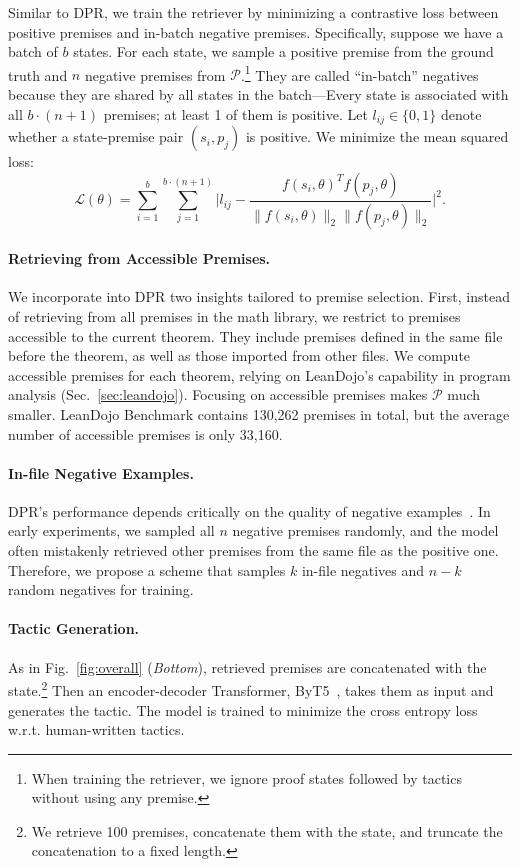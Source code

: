 \documentclass{article}
\newcommand{\smallsec}[1]{\vspace{-1mm} \paragraph{#1.}}
\newcommand\numpremises{130,262}
\newcommand\numaccessiblepremises{33,160}
\begin{document}
Similar to DPR, we train the retriever by minimizing a contrastive loss between positive premises and in-batch negative premises. Specifically, suppose we have a batch of $b$ states. For each state, we sample a positive premise from the ground truth and $n$ negative premises from $\mathcal{P}$.\footnote{When training the retriever, we ignore proof states followed by tactics without using any premise.} They are called ``in-batch'' negatives because they are shared by all states in the batch---Every state is associated with all $b \cdot (n+1)$ premises; at least 1 of them is positive.
Let $l_{ij} \in \{0, 1\}$ denote whether a state-premise pair $(s_i, p_j)$ is positive. We minimize the mean squared loss: 
\begin{equation}
\mathcal{L(\theta)} = \sum_{i=1}^{b} \sum_{j=1}^{b \cdot (n + 1)} \Big\lvert l_{ij} - \frac{f(s_i, \theta)^T f(p_j, \theta)}{\lVert f(s_i, \theta) \rVert_2 \lVert f(p_j, \theta) \rVert_2} \Big\rvert^{2}.
\end{equation}


\smallsec{Retrieving from Accessible Premises} We incorporate into DPR two insights tailored to premise selection.
First, instead of retrieving from all premises in the math library, we restrict to premises accessible to the current theorem. They include premises defined in the same file before the theorem, as well as those imported from other files. We compute accessible premises for each theorem, relying on LeanDojo's capability in program analysis (Sec.~\ref{sec:leandojo}). Focusing on accessible premises makes $\mathcal{P}$ much smaller. LeanDojo Benchmark contains {\numpremises} premises in total, but the average number of accessible premises is only {\numaccessiblepremises}.

\smallsec{In-file Negative Examples}
DPR's performance depends critically on the quality of negative examples~\cite{zhan2021optimizing,lu2021multi}. In early experiments, we sampled all $n$ negative premises randomly, and the model often mistakenly retrieved other premises from the same file as the positive one. Therefore, we propose a scheme that samples $k$ in-file negatives and $n-k$ random negatives for training.



\smallsec{Tactic Generation}
As in Fig.~\ref{fig:overall} (\emph{Bottom}), retrieved premises are concatenated with the state.\footnote{We retrieve 100 premises, concatenate them with the state, and truncate the concatenation to a fixed length.} Then an encoder-decoder Transformer, ByT5~\cite{xue2022byt5}, takes them as input and generates the tactic. The model is trained to minimize the cross entropy loss w.r.t. human-written tactics.
\end{document}
